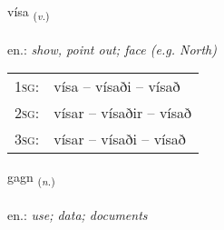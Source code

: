 \documentclass[frontgrid, backgrid]{flacards}\usepackage[]{graphicx}\usepackage[]{xcolor}
\begin{document}
\renewcommand{\flhead}{\vskip5pt \fboxsep=0pt {\small\bfseries\footnotesize Sagnorð | Verb}}
\renewcommand{\fcfoot}{\vskip5pt \fboxsep=0pt \hspace{2pt}{\small\bfseries\footnotesize 1K}}

\renewcommand{\blhead}{\vskip5pt {\small\bfseries\footnotesize Sagnorð | Verb }}
\renewcommand{\bcfoot}{\vskip5pt \hspace{2pt}{\small\bfseries\footnotesize 1K}}


{vísa \small{\textsubscript{(\textit{v.})}} \\[1ex] %
\textphonetic{[viːsa]} \\
en.: \emph{show, point out; face (e.g. North)} \\  [2ex]
\renewcommand*{\arraystretch}{0.8}
\begin{tabular}{p{1cm}l}
\textsc{1sg}: & vísa -- vísaði -- vísað \\ 
\textsc{2sg}: & vísar -- vísaðir -- vísað \\ 
\textsc{3sg}: & vísar -- vísaði -- vísað \\ 
\end{tabular}
}

\renewcommand{\flhead}{\vskip5pt \fboxsep=0pt {\small\bfseries\footnotesize Nafnorð | Noun}}
\renewcommand{\fcfoot}{\vskip5pt \fboxsep=0pt \hspace{2pt}{\small\bfseries\footnotesize 1K}}

\renewcommand{\blhead}{\vskip5pt {\small\bfseries\footnotesize Nafnorð | Noun }}
\renewcommand{\bcfoot}{\vskip5pt \hspace{2pt}{\small\bfseries\footnotesize 1K}}


{gagn \small{\textsubscript{(\textit{n.})}} \\[1ex] %
\textphonetic{[kakn̥]} \\
en.: \emph{use; data; documents} \\  [2ex]
\renewcommand*{\arraystretch}{0.8}
}
\end{document}
